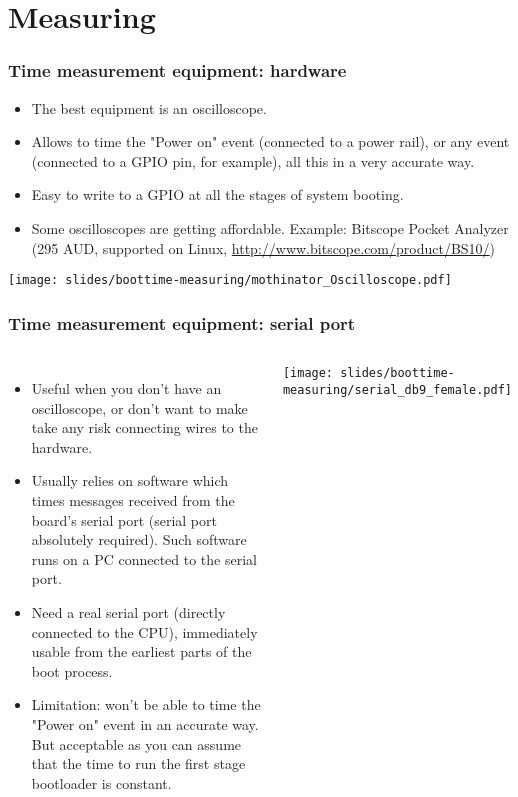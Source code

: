 \section{Measuring}

\begin{frame}
\frametitle{Time measurement equipment: hardware}
\begin{itemize}
\item The best equipment is an oscilloscope.
\item Allows to time the "Power on" event (connected to a power rail),
      or any event (connected to a GPIO pin, for example), all this
      in a very accurate way.
\item Easy to write to a GPIO at all the stages of system booting.
\item Some oscilloscopes are getting affordable. Example: Bitscope
      Pocket Analyzer (295 AUD, supported on Linux, \url{http://www.bitscope.com/product/BS10/})
\end{itemize}
\begin{center}
    \texttt{[image: slides/boottime-measuring/mothinator\_Oscilloscope.pdf]}
\end{center}
\end{frame}

\begin{frame}
\frametitle{Time measurement equipment: serial port}
\begin{columns}
\begin{itemize}
\item Useful when you don't have an oscilloscope, or don't want to make
      take any risk connecting wires to the hardware.
\item Usually relies on software which times messages received from the board's
      serial port (serial port absolutely required). Such software
      runs on a PC connected to the serial port.
\item Need a real serial port (directly connected to the CPU),
      immediately usable from the earliest parts of the boot process.
\item Limitation: won't be able to time the "Power on" event in
      an accurate way. But acceptable as you can assume that
      the time to run the first stage bootloader is constant.
\end{itemize}
\texttt{[image: slides/boottime-measuring/serial\_db9\_female.pdf]}
\end{columns}
\end{frame}

